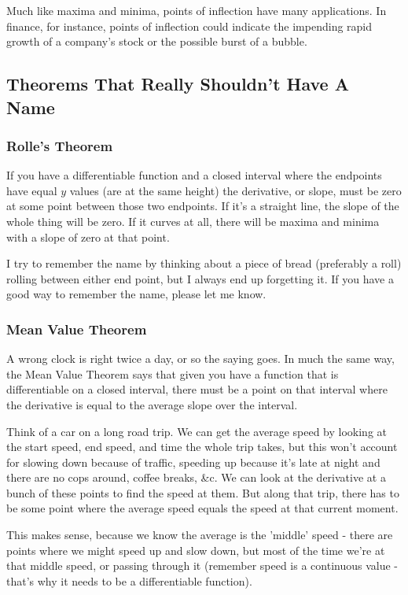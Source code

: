 Much like maxima and minima, points of inflection have many applications. In finance, for instance, points of inflection could indicate the impending rapid growth of a company's stock or the possible burst of a bubble. 

\subsection{Theorems That Really Shouldn't Have A Name}

\subsubsection{Rolle's Theorem}

If you have a differentiable function and a closed interval where the endpoints have equal $y$ values (are at the same height) the derivative, or slope, must be zero at some point between those two endpoints. If it's a straight line, the slope of the whole thing will be zero. If it curves at all, there will be maxima and minima with a slope of zero at that point. 

I try to remember the name by thinking about a piece of bread (preferably a roll) rolling between either end point, but I always end up forgetting it. If you have a good way to remember the name, please let me know.

\subsubsection{Mean Value Theorem}

A wrong clock is right twice a day, or so the saying goes. In much the same way, the Mean Value Theorem says that given you have a function that is differentiable on a closed interval, there must be a point on that interval where the derivative is equal to the average slope over the interval.

Think of a car on a long road trip. We can get the average speed by looking at the start speed, end speed, and time the whole trip takes, but this won't account for slowing down because of traffic, speeding up because it's late at night and there are no cops around, coffee breaks, \&c. We can look at the derivative at a bunch of these points to find the speed at them. But along that trip, there has to be some point where the average speed equals the speed at that current moment. 

This makes sense, because we know the average is the 'middle' speed - there are points where we might speed up and slow down, but most of the time we're at that middle speed, or passing through it (remember speed is a continuous value - that's why it needs to be a differentiable function). 

